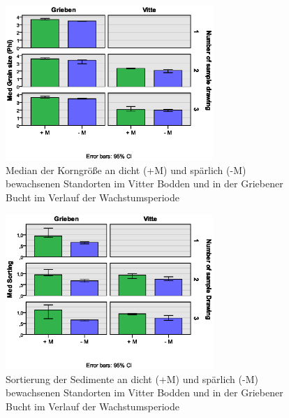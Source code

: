 \begin{figure}[htb]
\centering
\includegraphics[width=0.70\textwidth]{images/sedimentparameter/S-Parameter_MD_KG_neu1.eps}
\caption[Median der Korngröße Grieben und Vitte]{Median der Korngröße an dicht (+M) und spärlich (-M) bewachsenen Standorten im Vitter Bodden und in der Griebener Bucht im Verlauf der Wachstumsperiode}
\label{fig:md_korngroesse_hiddensee}
\end{figure}


\begin{figure}[htb]
\centering
\includegraphics[width=0.70\textwidth]{images/sedimentparameter/S_Parameter_Sortierung_neu1.eps}
\caption[Sortierung der Sedimente in Grieben und Vitte]{Sortierung der Sedimente an dicht (+M) und spärlich (-M) bewachsenen Standorten im Vitter Bodden und in der Griebener Bucht im Verlauf der Wachstumsperiode}
\label{fig:sortierung}
\end{figure}



